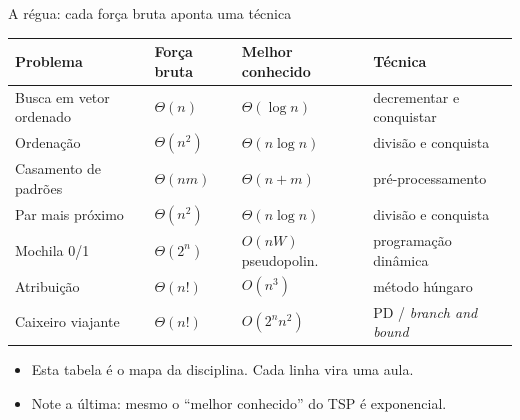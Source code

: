 \documentclass[aspectratio=169]{beamer}
\begin{document}
\begin{frame}{A régua: cada força bruta aponta uma técnica}
  \begin{center}
  \small
  \begin{tabular}{@{}llll@{}}
    \toprule
    \textbf{Problema} & \textbf{Força bruta} & \textbf{Melhor conhecido} & \textbf{Técnica} \\
    \midrule
    Busca em vetor ordenado & $\Theta(n)$    & $\Theta(\log n)$      & decrementar e conquistar \\
    Ordenação               & $\Theta(n^2)$  & $\Theta(n \log n)$    & divisão e conquista \\
    Casamento de padrões    & $\Theta(nm)$   & $\Theta(n+m)$         & pré-processamento \\
    Par mais próximo        & $\Theta(n^2)$  & $\Theta(n \log n)$    & divisão e conquista \\
    Mochila 0/1             & $\Theta(2^n)$  & $O(nW)$ pseudopolin.  & programação dinâmica \\
    Atribuição              & $\Theta(n!)$   & $O(n^3)$              & método húngaro \\
    Caixeiro viajante       & $\Theta(n!)$   & $O(2^n n^2)$          & PD / \emph{branch and bound} \\
    \bottomrule
  \end{tabular}
  \end{center}

  \medskip
  \begin{itemize}
    \item Esta tabela é o mapa da disciplina. Cada linha vira uma aula.
    \item Note a última: mesmo o ``melhor conhecido'' do TSP é exponencial.
  \end{itemize}
\end{frame}
\end{document}
